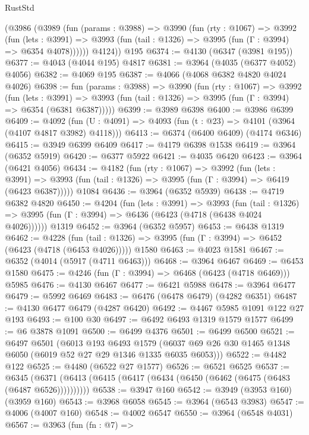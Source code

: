 \begin{lexlean}{RustStd}
\begin{coremodule}
      (@3986
        (@3989
          (fun (params : @3988) =>
          @3990
            (fun (rty : @1067) =>
            @3992
              (fun (lets : @3991) =>
              @3993 (fun (tail : @1326) => @3995 (fun (Γ : @3994) => @6354 @4078))))))
        @4124))
    @195
@6374 := @4130 (@6347 (@3981 @195))
@6377 := @4043 (@4044 @195) @4817
@6381 := @3964 (@4035 (@6377 @4052) @4056)
@6382 := @4069 @195
@6387 := @4066 (@4068 @6382 @4820 @4024 @4026)
@6398 := fun (params : @3988) =>
  @3990
    (fun (rty : @1067) =>
    @3992
      (fun (lets : @3991) =>
      @3993 (fun (tail : @1326) => @3995 (fun (Γ : @3994) => @6354 (@6381 @6387)))))
@6399 := @3989 @6398
@6400 := @3986 @6399
@6409 := @4092 (fun (U : @4091) => @4093 (fun (t : @23) => @4101 (@3964 (@4107 @4817 @3982) @4118)))
@6413 := @6374 (@6400 @6409) (@4174 @6346)
@6415 := @3949 @6399 @6409
@6417 := @4179 @6398 @1538
@6419 := @3964 (@6352 @5919)
@6420 := @6377 @5922
@6421 := @4035 @6420
@6423 := @3964 (@6421 @4056)
@6434 := @4182
    (fun (rty : @1067) =>
    @3992
      (fun (lets : @3991) =>
      @3993 (fun (tail : @1326) => @3995 (fun (Γ : @3994) => @6419 (@6423 @6387)))))
    @1084
@6436 := @3964 (@6352 @5939)
@6438 := @4719 @6382 @4820
@6450 := @4204
    (fun (lets : @3991) =>
    @3993
      (fun (tail : @1326) => @3995 (fun (Γ : @3994) => @6436 (@6423 (@4718 (@6438 @4024 @4026))))))
    @1319
@6452 := @3964 (@6352 @5957)
@6453 := @6438 @1319
@6462 := @4228
    (fun (tail : @1326) => @3995 (fun (Γ : @3994) => @6452 (@6423 (@4718 (@6453 @4026)))))
    @1580
@6463 := @4023 @1581
@6467 := @6352 (@4014 (@5917 (@4711 @6463)))
@6468 := @3964 @6467
@6469 := @6453 @1580
@6475 := @4246 (fun (Γ : @3994) => @6468 (@6423 (@4718 @6469))) @5985
@6476 := @4130 @6467
@6477 := @6421 @5988
@6478 := @3964 @6477
@6479 := @5992 @6469
@6483 := @6476 (@6478 @6479) (@4282 @6351)
@6487 := @4130 @6477 @6479 (@4287 @6420)
@6492 := @4467 @5985 @1091 @122 @27 @193
@6493 := @100 @30
@6497 := @6492 @6493 @1319 @1579 @1577
@6499 := @6 @3878 @1091
@6500 := @6499 @4376
@6501 := @6499 @6500
@6521 := @6497
    @6501
    (@6013
      @193
      @6493
      @1579
      (@6037 @69 @26 @30 @1465 @1348 @6050 (@6019 @52 @27 @29 @1346 @1335 @6035 @6053)))
@6522 := @4482 @122
@6525 := @4480 (@6522 @27 @1577)
@6526 := @6521 @6525
@6537 := @6345 (@6371 (@6413 (@6415 (@6417 (@6434 (@6450 (@6462 (@6475 (@6483 (@6487 @6526))))))))))
@6538 := @3947 @160
@6542 := @3949 (@3953 @160) (@3959 @160)
@6543 := @3968 @6058
@6545 := @3964 (@6543 @3983)
@6547 := @4006 (@4007 @160)
@6548 := @4002 @6547
@6550 := @3964 (@6548 @4031)
@6567 := @3963
    (fun (fn : @7) =>

\end{coremodule}
\end{lexlean}
